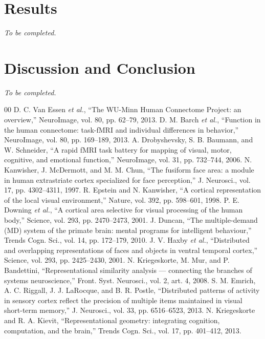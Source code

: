 \documentclass[conference]{IEEEtran}
\begin{document}
\section{Results}
\emph{To be completed.}

\section{Discussion and Conclusion}
\emph{To be completed.}

\begin{thebibliography}{00}
 D. C. Van Essen \emph{et al.}, ``The WU-Minn Human Connectome Project: an overview,'' NeuroImage, vol. 80, pp. 62--79, 2013.
 D. M. Barch \emph{et al.}, ``Function in the human connectome: task-fMRI and individual differences in behavior,'' NeuroImage, vol. 80, pp. 169--189, 2013.
 A. Drobyshevsky, S. B. Baumann, and W. Schneider, ``A rapid fMRI task battery for mapping of visual, motor, cognitive, and emotional function,'' NeuroImage, vol. 31, pp. 732--744, 2006.
 N. Kanwisher, J. McDermott, and M. M. Chun, ``The fusiform face area: a module in human extrastriate cortex specialized for face perception,'' J. Neurosci., vol. 17, pp. 4302--4311, 1997.
 R. Epstein and N. Kanwisher, ``A cortical representation of the local visual environment,'' Nature, vol. 392, pp. 598--601, 1998.
 P. E. Downing \emph{et al.}, ``A cortical area selective for visual processing of the human body,'' Science, vol. 293, pp. 2470--2473, 2001.
 J. Duncan, ``The multiple-demand (MD) system of the primate brain: mental programs for intelligent behaviour,'' Trends Cogn. Sci., vol. 14, pp. 172--179, 2010.
 J. V. Haxby \emph{et al.}, ``Distributed and overlapping representations of faces and objects in ventral temporal cortex,'' Science, vol. 293, pp. 2425--2430, 2001.
 N. Kriegeskorte, M. Mur, and P. Bandettini, ``Representational similarity analysis --- connecting the branches of systems neuroscience,'' Front. Syst. Neurosci., vol. 2, art. 4, 2008.
 S. M. Emrich, A. C. Riggall, J. J. LaRocque, and B. R. Postle, ``Distributed patterns of activity in sensory cortex reflect the precision of multiple items maintained in visual short-term memory,'' J. Neurosci., vol. 33, pp. 6516--6523, 2013.
 N. Kriegeskorte and R. A. Kievit, ``Representational geometry: integrating cognition, computation, and the brain,'' Trends Cogn. Sci., vol. 17, pp. 401--412, 2013.

\end{thebibliography}
\end{document}
